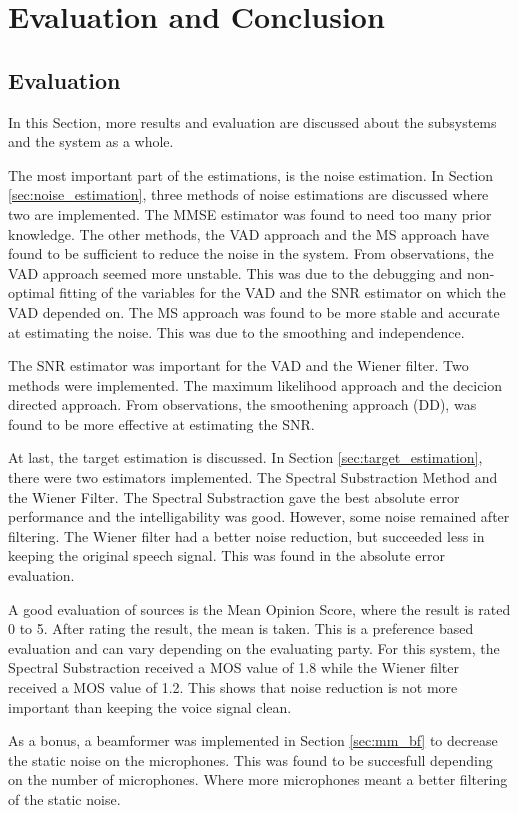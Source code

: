 \section{Evaluation and Conclusion} \label{sec:conclusion}
\subsection{Evaluation}
In this Section, more results and evaluation are discussed about the subsystems and the system as a whole.

The most important part of the estimations, is the noise estimation. In Section \ref{sec:noise_estimation}, three methods of noise estimations are discussed where two are implemented. The MMSE estimator was found to need too many prior knowledge. The other methods, the VAD approach and the MS approach have found to be sufficient to reduce the noise in the system. From observations, the VAD approach seemed more unstable. This was due to the debugging and non-optimal fitting of the variables for the VAD and the SNR estimator on which the VAD depended on. The MS approach was found to be more stable and accurate at estimating the noise. This was due to the smoothing and independence.

The SNR estimator was important for the VAD and the Wiener filter. Two methods were implemented. The maximum likelihood approach and the decicion directed approach. From observations, the smoothening approach (DD), was found to be more effective at estimating the SNR.

At last, the target estimation is discussed. In Section \ref{sec:target_estimation}, there were two estimators implemented. The Spectral Substraction Method and the Wiener Filter. The Spectral Substraction gave the best absolute error performance and the intelligability was good. However, some noise remained after filtering. The Wiener filter had a better noise reduction, but succeeded less in keeping the original speech signal. This was found in the absolute error evaluation.

A good evaluation of sources is the Mean Opinion Score, where the result is rated 0 to 5. After rating the result, the mean is taken. This is a preference based evaluation and can vary depending on the evaluating party. For this system, the Spectral Substraction received a MOS value of 1.8 while the Wiener filter received a MOS value of 1.2. This shows that noise reduction is not more important than keeping the voice signal clean.

As a bonus, a beamformer was implemented in Section \ref{sec:mm_bf} to decrease the static noise on the microphones. This was found to be succesfull depending on the number of microphones. Where more microphones meant a better filtering of the static noise.


